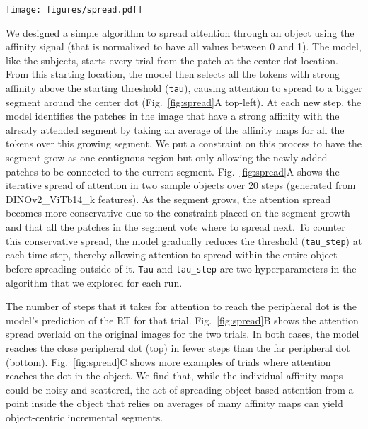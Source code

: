 \documentclass{article}
\begin{document}

\begin{figure*}[h]
\begin{center}
\texttt{[image: figures/spread.pdf]}
\end{center}
\caption{\textbf{A)} 20 steps of attention spread for two trials (top vs bottom two rows), each starting from the center dot. \textbf{B)} Attention spread overlaid on the image for the steps that attention reached the peripheral dot in the close (top) and far (bottom) conditions for both trials. \textbf{C)} Examples of attention spreading in objects.}
\label{fig:spread}
\end{figure*}

We designed a simple algorithm to spread attention through an object using the affinity signal (that is normalized to have all values between 0 and 1). The model, like the subjects, starts every trial from the patch at the center dot location. From this starting location, the model then selects all the tokens with strong affinity above the starting threshold (\texttt{tau}), causing attention to spread to a bigger segment around the center dot (Fig.~\ref{fig:spread}A top-left). At each new step, the model identifies the patches in the image that have a strong affinity with the already attended segment by taking an average of the affinity maps for all the tokens over this growing segment. We put a constraint on this process to have the segment grow as one contiguous region but only allowing the newly added patches to be connected to the current segment. Fig.~\ref{fig:spread}A shows the iterative spread of attention in two sample objects over 20 steps (generated from DINOv2\_ViTb14\_k features). As the segment grows, the attention spread becomes more conservative due to the constraint placed on the segment growth and that all the patches in the segment vote where to spread next. To counter this conservative spread, the model gradually reduces the threshold (\texttt{tau\_step}) at each time step, thereby allowing attention to spread within the entire object before spreading outside of it. \texttt{Tau} and \texttt{tau\_step} are two hyperparameters in the algorithm that we explored for each run.   

The number of steps that it takes for attention to reach the peripheral dot is the model's prediction of the RT for that trial. Fig.~\ref{fig:spread}B shows the attention spread overlaid on the original images for the two trials. In both cases, the model reaches the close peripheral dot (top) in fewer steps than the far peripheral dot (bottom). Fig.~\ref{fig:spread}C shows more examples of trials where attention reaches the dot in the object. We find that, while the individual affinity maps could be noisy and scattered, the act of spreading object-based attention from a point inside the object that relies on averages of many affinity maps can yield object-centric incremental segments. 
\end{document}
